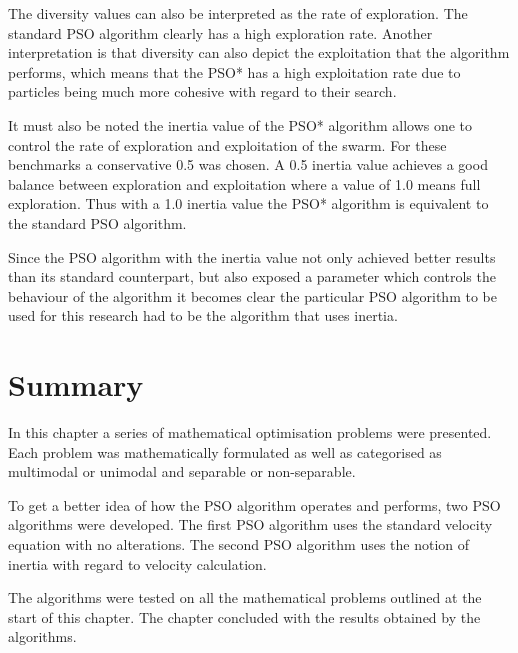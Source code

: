 The diversity values can also be interpreted as the rate of exploration. The standard PSO algorithm clearly has a high exploration rate. Another interpretation is that diversity can also depict the exploitation that the algorithm performs, which means that the PSO* has a high exploitation rate due to particles being much more cohesive with regard to their search.

It must also be noted the inertia value of the PSO* algorithm allows one to control the rate of exploration and exploitation of the swarm. For these benchmarks a conservative 0.5 was chosen. A 0.5 inertia value achieves a good balance between exploration and exploitation where a value of 1.0 means full exploration. Thus with a 1.0 inertia value the PSO* algorithm is equivalent to the standard PSO algorithm.

Since the PSO algorithm with the inertia value not only achieved better results than its standard counterpart, but also exposed a parameter which controls the behaviour of the algorithm it becomes clear the particular PSO algorithm to be used for this research had to be the algorithm that uses inertia.
\section{Summary}
In this chapter a series of mathematical optimisation problems were presented. Each problem was mathematically formulated as well as categorised as multimodal or unimodal and separable or non-separable.

To get a better idea of how the PSO algorithm operates and performs, two PSO algorithms were developed. The first PSO algorithm uses the standard velocity equation with no alterations. The second PSO algorithm uses the notion of inertia with regard to velocity calculation.

The algorithms were tested on all the mathematical problems outlined at the start of this chapter. The chapter concluded with the results obtained by the algorithms.
